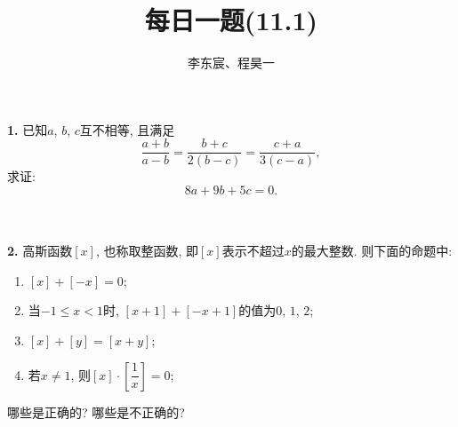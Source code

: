 \documentclass{article}
\title{每日一题(11.1)}
\author{\kaishu 李东宸、程昊一}
\begin{document}
\maketitle
\textbf{1. }已知$a$, $b$, $c$互不相等, 且满足
\[\frac{a+b}{a-b}=\frac{b+c}{2(b-c)}=\frac{c+a}{3(c-a)},\]
求证:
\[8a+9b+5c=0.\]\\
\\\par
\textbf{2. }高斯函数$[x]$, 也称取整函数, 即$[x]$表示不超过$x$的最大整数. 则下面的命题中: 
\begin{enumerate}[noitemsep,label={(\arabic*)}]
	\item $[x]+[-x]=0$;
	\item 当$-1\le x<1$时, $[x+1]+[-x+1]$的值为$0$, $1$, $2$;
	\item $[x]+[y]=[x+y]$;
	\item 若$x\neq 1$, 则$[x]\cdot\left[\dfrac{1}{x}\right]=0$;
\end{enumerate}
哪些是正确的? 哪些是不正确的?\\
\end{document}
